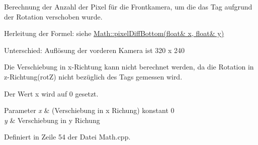 Berechnung der Anzahl der Pixel für die Frontkamera, um die das Tag aufgrund der Rotation verschoben wurde. 

Herleitung der Formel: siehe \hyperlink{namespace_math_a25b9284eb485b732c952786b63343aaa}{Math::pixelDiffBottom(float\& x, float\& y)} \par
 Unterschied: Auflösung der vorderen Kamera ist 320 x 240

Die Verschiebung in x-\/Richtung kann nicht berechnet werden, da die Rotation in z-\/Richtung(rotZ) nicht bezüglich des Tags gemessen wird.\par
 Der Wert x wird auf 0 gesetzt.


\begin{DoxyParams}{Parameter}
{\em x} & (Verschiebung in x Richung) konstant 0 \\
\hline
{\em y} & Verschiebung in y Richung \\
\hline
\end{DoxyParams}


Definiert in Zeile 54 der Datei Math.cpp.

